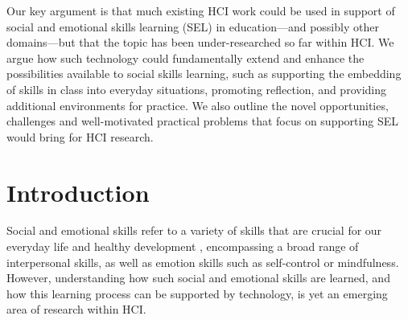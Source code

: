 \documentclass[prodmode,acmtochi]{acmsmall}
\newcommand{\todo}[1]{\textrm{\textrm{\textcolor{LightBlue}{[[#1]]}}}}
\newcommand{\GeraldineFIX}[1]{}
\begin{document}
Our key argument is that much existing HCI work could be used in support of social and emotional skills learning (SEL) in education---and possibly other domains---but that the topic has been under-researched so far within HCI. We argue how such technology could fundamentally extend and enhance the possibilities available to social skills learning, such as supporting the embedding of skills in class into everyday situations, promoting reflection, and providing additional environments for practice. We also outline the novel opportunities, challenges and well-motivated practical problems that focus on supporting SEL would bring for HCI research. 



   



\section{Introduction}

Social and emotional skills refer to a variety of skills that are crucial for our everyday life and healthy development \cite{Weare2011,Adi2007a,Damon2006},  encompassing a broad range of interpersonal skills, as well as emotion skills such as self-control or mindfulness. 
%
However, understanding how such social and emotional skills are learned, and how this learning process can be supported by technology, is yet an emerging area of research within HCI. 
\end{document}
